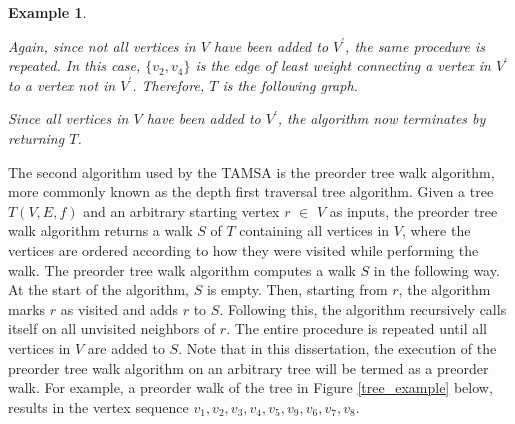 \documentclass[12pt]{article}
\newtheorem{example}[definition]{Example}
\numberwithin{equation}{subsection}
\numberwithin{table}{subsection}
\numberwithin{algorithm}{subsection}
\numberwithin{figure}{subsection}
\begin{document}
\begin{example}
\begin{center}
\end{center}
Again, since not all vertices in $V$ have been added to $V^\prime$, the same procedure is repeated. In this case, $\{v_2, v_4\}$ is the edge of least weight connecting a vertex in $V^\prime$ to a vertex not in $V^\prime$. Therefore, $T$ is the following graph.
\begin{center}
\end{center}
Since all vertices in $V$ have been added to $V^\prime$, the algorithm now terminates by returning $T$.
\end{example}
The second algorithm used by the TAMSA is the preorder tree walk algorithm, more commonly known as the depth first traversal tree algorithm. Given a tree $T(V,E,f)$ and an arbitrary starting vertex $r$ $\in$ $V$ as inputs, the preorder tree walk algorithm returns a walk $S$ of $T$ containing all vertices in $V$, where the vertices are ordered according to how they were visited while performing the walk. The preorder tree walk algorithm computes a walk $S$ in the following way. At the start of the algorithm, $S$ is empty. Then, starting from $r$, the algorithm marks $r$ as visited and adds $r$ to $S$. Following this, the algorithm recursively calls itself on all unvisited neighbors of $r$. The entire procedure is repeated until all vertices in $V$ are added to $S$. Note that in this dissertation, the execution of the preorder tree walk algorithm on an arbitrary tree will be termed as a preorder walk. For example, a preorder walk of the tree in Figure \ref{tree_example} below, results in the vertex sequence $v_1, v_2, v_3, v_4, v_5, v_9, v_6, v_7, v_8$. \cite{cormen_leiserson_rivest_stein}
\end{document}
